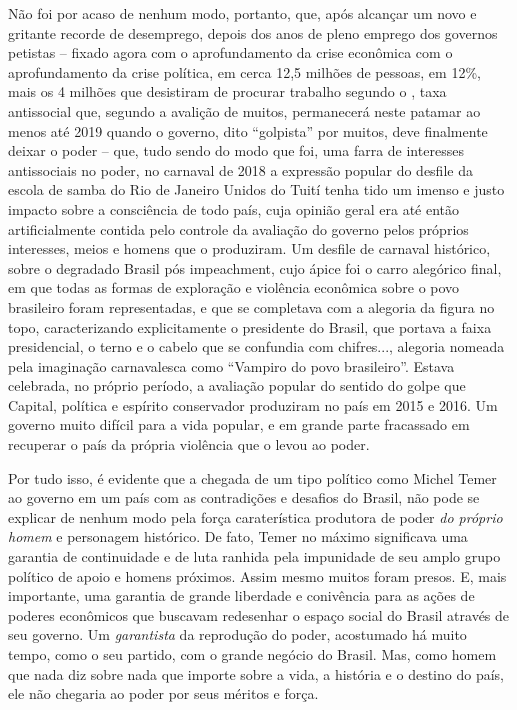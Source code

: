 Não foi por acaso de nenhum modo, portanto, que, após alcançar um novo e
gritante recorde de desemprego, depois dos anos de pleno emprego dos
governos petistas -- fixado agora com o aprofundamento da crise
econômica com o aprofundamento da crise política, em cerca 12,5 milhões
de pessoas, em 12\%, mais os 4 milhões que desistiram de procurar
trabalho segundo o , taxa antissocial que, segundo a avalição de
muitos, permanecerá neste patamar ao menos até 2019 quando o governo,
dito ``golpista'' por muitos, deve finalmente deixar o poder -- que,
tudo sendo do modo que foi, uma farra de interesses antissociais no
poder, no carnaval de 2018 a expressão popular do desfile da escola de
samba do Rio de Janeiro Unidos do Tuití tenha tido um imenso e justo
impacto sobre a consciência de todo país, cuja opinião geral era até
então artificialmente contida pelo controle da avaliação do governo
pelos próprios interesses, meios e homens que o produziram. Um desfile
de carnaval histórico, sobre o degradado Brasil pós impeachment, cujo
ápice foi o carro alegórico final, em que todas as formas de exploração
e violência econômica sobre o povo brasileiro foram representadas, e que
se completava com a alegoria da figura no topo, caracterizando
explicitamente o presidente do Brasil, que portava a faixa presidencial,
o terno e o cabelo que se confundia com chifres..., alegoria nomeada
pela imaginação carnavalesca como ``Vampiro do povo brasileiro''. Estava
celebrada, no próprio período, a avaliação popular do sentido do golpe
que Capital, política e espírito conservador produziram no país em 2015
e 2016. Um governo muito difícil para a vida popular, e em grande parte
fracassado em recuperar o país da própria violência que o levou ao
poder.

Por tudo isso, é evidente que a chegada de um tipo político como Michel
Temer ao governo em um país com as contradições e desafios do Brasil,
não pode se explicar de nenhum modo pela força caraterística produtora
de poder \emph{do próprio homem} e personagem histórico. De fato, Temer
no máximo significava uma garantia de continuidade e de luta ranhida
pela impunidade de seu amplo grupo político de apoio e homens próximos.
Assim mesmo muitos foram presos. E, mais importante, uma garantia de
grande liberdade e conivência para as ações de poderes econômicos que
buscavam redesenhar o espaço social do Brasil através de seu governo. Um
\emph{garantista} da reprodução do poder, acostumado há muito tempo,
como o seu partido, com o grande negócio do Brasil. Mas, como homem que
nada diz sobre nada que importe sobre a vida, a história e o destino do
país, ele não chegaria ao poder por seus méritos e força.

